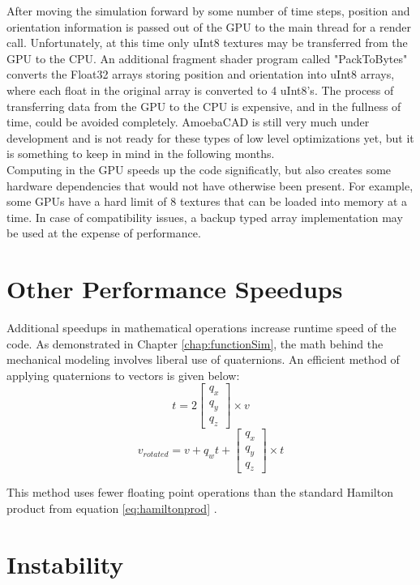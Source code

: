 {After moving the simulation forward by some number of time steps, position and orientation information is passed out of the GPU to the main thread for a render call.  Unfortunately, at this time only uInt8 textures may be transferred from the GPU to the CPU.  An additional fragment shader program called "PackToBytes" converts the Float32 arrays storing position and orientation into uInt8 arrays, where each float in the original array is converted to 4 uInt8's.  The process of transferring data from the GPU to the CPU is expensive, and in the fullness of time, could be avoided completely.  AmoebaCAD is still very much under development and is not ready for these types of low level optimizations yet, but it is something to keep in mind in the following months.\\

Computing in the GPU speeds up the code significatly, but also creates some hardware dependencies that would not have otherwise been present.  For example, some GPUs have a hard limit of 8 textures that can be loaded into memory at a time.  In case of compatibility issues, a backup typed array implementation may be used at the expense of performance.

\section{Other Performance Speedups}

Additional speedups in mathematical operations increase runtime speed of the code.  As demonstrated in Chapter \ref{chap:functionSim}, the math behind the mechanical modeling involves liberal use of quaternions.  An efficient method of applying quaternions to vectors is given below:
\[ t = 2 \left[ \begin{array}{ccc}
q_x\\
q_y\\
q_z
 \end{array} \right] \times v\]
\[ v_{rotated} = v + q_wt +  \left[ \begin{array}{ccc}
q_x\\
q_y\\
q_z
 \end{array} \right] \times t\]
 
 This method uses fewer floating point operations than the standard Hamilton product from equation \ref{eq:hamiltonprod} \cite{Reinalter}.

\section{Instability}

}

